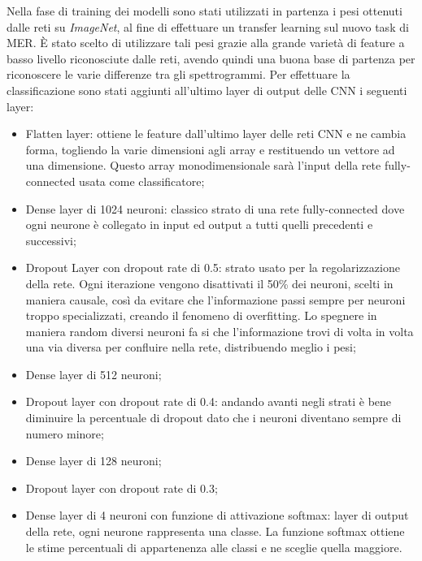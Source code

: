 \documentclass[11pt]{report}
\begin{document}
Nella fase di training dei modelli sono stati utilizzati in partenza i pesi ottenuti dalle reti su \textit{ImageNet}, al fine di effettuare un transfer learning sul nuovo task di MER. È stato scelto di utilizzare tali pesi grazie alla grande varietà di feature a basso livello riconosciute dalle reti, avendo quindi una buona base di partenza per riconoscere le varie differenze tra gli spettrogrammi. Per effettuare la classificazione sono stati aggiunti all'ultimo layer di output delle CNN i seguenti layer:
\begin{itemize}
    \item Flatten layer: ottiene le feature dall'ultimo layer delle reti CNN e ne cambia forma, togliendo la varie dimensioni agli array e restituendo un vettore ad una dimensione. Questo array monodimensionale sarà l'input della rete fully-connected usata come classificatore;
    
    \item Dense layer di 1024 neuroni: classico strato di una rete fully-connected dove ogni neurone è collegato in input ed output a tutti quelli precedenti e successivi;
    
    \item Dropout Layer con dropout rate di 0.5: strato usato per la regolarizzazione della rete. Ogni iterazione vengono disattivati il 50\% dei neuroni, scelti in maniera causale, così da evitare che l'informazione passi sempre per neuroni troppo specializzati, creando il fenomeno di overfitting. Lo spegnere in maniera random diversi neuroni fa si che l'informazione trovi di volta in volta una via diversa per confluire nella rete, distribuendo meglio i pesi;

    \item Dense layer di 512 neuroni;
    
    \item Dropout layer con dropout rate di 0.4: andando avanti negli strati è bene diminuire la percentuale di dropout dato che i neuroni diventano sempre di numero minore;
    
    \item Dense layer di 128 neuroni;
    
    \item Dropout layer con dropout rate di 0.3;
    
    \item Dense layer di 4 neuroni con funzione di attivazione softmax: layer di output della rete, ogni neurone rappresenta una classe. La funzione softmax ottiene le stime percentuali di appartenenza alle classi e ne sceglie quella maggiore.
\end{itemize}
\end{document}
